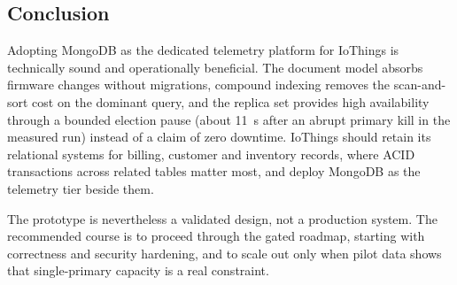 \documentclass[11pt,a4paper]{article}
\begin{document}
\subsection{Conclusion}
Adopting MongoDB as the dedicated telemetry platform for IoThings is technically sound and operationally beneficial. The document model absorbs firmware changes without migrations, compound indexing removes the scan-and-sort cost on the dominant query, and the replica set provides high availability through a bounded election pause (about 11~s after an abrupt primary kill in the measured run) instead of a claim of zero downtime. IoThings should retain its relational systems for billing, customer and inventory records, where ACID transactions across related tables matter most, and deploy MongoDB as the telemetry tier beside them.

The prototype is nevertheless a validated design, not a production system. The recommended course is to proceed through the gated roadmap, starting with correctness and security hardening, and to scale out only when pilot data shows that single-primary capacity is a real constraint.
\end{document}
